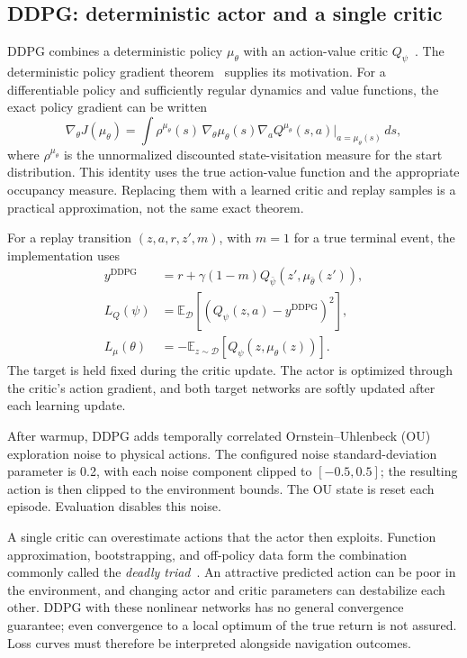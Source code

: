 \documentclass[11pt,a4paper]{article}
\theoremstyle{definition}
\theoremstyle{plain}
\theoremstyle{remark}
\newcommand{\E}{\mathbb{E}}
\begin{document}
\subsection{DDPG: deterministic actor and a single critic}
\label{sec:ddpg}

DDPG combines a deterministic policy $\mu_\theta$ with an action-value critic $Q_\psi$~\cite{lillicrap2015}. The deterministic policy gradient theorem~\cite{silver2014} supplies its motivation. For a differentiable policy and sufficiently regular dynamics and value functions, the exact policy gradient can be written
\begin{equation}
 \nabla_\theta J(\mu_\theta)=
 \int\rho^{\mu_\theta}(s)\,
 \nabla_\theta\mu_\theta(s)
 \nabla_a Q^{\mu_\theta}(s,a)\big|_{a=\mu_\theta(s)}\,ds,
 \label{eq:dpg}
\end{equation}
where $\rho^{\mu_\theta}$ is the unnormalized discounted state-visitation measure for the start distribution. This identity uses the true action-value function and the appropriate occupancy measure. Replacing them with a learned critic and replay samples is a practical approximation, not the same exact theorem.

For a replay transition $(z,a,r,z',m)$, with $m=1$ for a true terminal event, the implementation uses
\begin{align}
 y^{\mathrm{DDPG}}&=r+\gamma(1-m)Q_{\bar\psi}(z',\mu_{\bar\theta}(z')),\\
 L_Q(\psi)&=\E_{\mathcal D}\left[(Q_\psi(z,a)-y^{\mathrm{DDPG}})^2\right],\\
 L_\mu(\theta)&=-\E_{z\sim\mathcal D}[Q_\psi(z,\mu_\theta(z))].
 \label{eq:ddpg-loss}
\end{align}
The target is held fixed during the critic update. The actor is optimized through the critic's action gradient, and both target networks are softly updated after each learning update.

After warmup, DDPG adds temporally correlated Ornstein--Uhlenbeck (OU) exploration noise to physical actions. The configured noise standard-deviation parameter is 0.2, with each noise component clipped to $[-0.5,0.5]$; the resulting action is then clipped to the environment bounds. The OU state is reset each episode. Evaluation disables this noise.

A single critic can overestimate actions that the actor then exploits. Function approximation, bootstrapping, and off-policy data form the combination commonly called the \emph{deadly triad}~\cite{sutton2018}. An attractive predicted action can be poor in the environment, and changing actor and critic parameters can destabilize each other. DDPG with these nonlinear networks has no general convergence guarantee; even convergence to a local optimum of the true return is not assured. Loss curves must therefore be interpreted alongside navigation outcomes.
\end{document}

